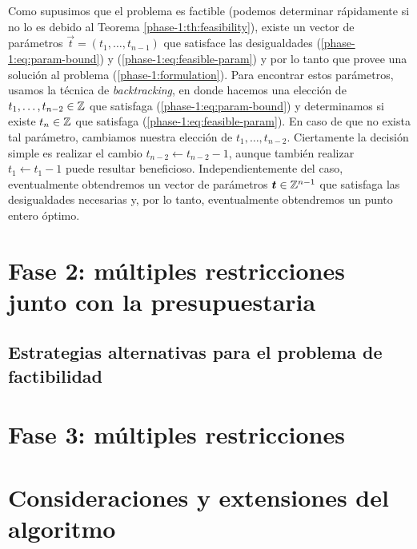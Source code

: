 Como supusimos que el problema es factible (podemos determinar rápidamente si no lo es debido al
Teorema \ref{phase-1:th:feasibility}), existe un vector de parámetros $\vec{t} = (t_1, \ldots,
t_{n-1})$ que satisface las desigualdades (\ref{phase-1:eq:param-bound}) y
(\ref{phase-1:eq:feasible-param}) y por lo tanto que provee una solución al problema
(\ref{phase-1:formulation}). Para encontrar estos parámetros, usamos la técnica de
\textit{backtracking}, en donde hacemos una elección de $t_1, \ldots, t_{n-2} \in \mathbb{Z}$ que satisfaga
(\ref{phase-1:eq:param-bound}) y determinamos si existe $t_n \in \mathbb{Z}$ que satisfaga
(\ref{phase-1:eq:feasible-param}). En caso de que no exista tal parámetro, cambiamos nuestra
elección de $t_1, \ldots, t_{n-2}$. Ciertamente la decisión simple es realizar el cambio $t_{n-2}
\leftarrow t_{n-2} - 1$, aunque también realizar $t_1 \leftarrow t_1 - 1$ puede resultar
beneficioso. Independientemente del caso, eventualmente obtendremos un vector de parámetros $\boldsymbol{t}
\in \mathbb{Z}^{n-1}$ que satisfaga las desigualdades necesarias y, por lo tanto, eventualmente obtendremos
un punto entero óptimo.


\section{Fase 2: múltiples restricciones junto con la presupuestaria}
\subsection{Estrategias alternativas para el problema de factibilidad}
\section{Fase 3: múltiples restricciones}
\section{Consideraciones y extensiones del algoritmo}
